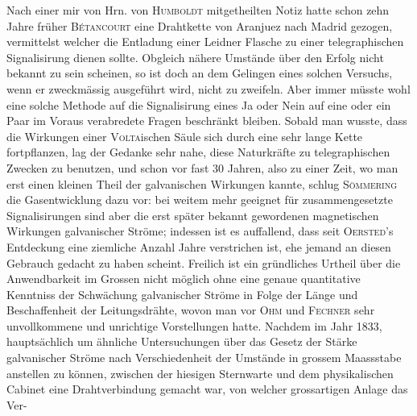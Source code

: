 \expandafter\def\csname HistoricalNoteText375\endcsname{Nach einer mir von Hrn. von \textsc{Humboldt} mitgetheilten Notiz hatte schon zehn Jahre früher \textsc{Bétancourt} eine Drahtkette von Aranjuez nach Madrid gezogen, vermittelst welcher die Entladung einer Leidner Flasche zu einer telegraphischen Signalisirung dienen sollte. Obgleich nähere Umstände über den Erfolg nicht bekannt zu sein scheinen, so ist doch an dem Gelingen eines solchen Versuchs, wenn er zweckmässig ausgeführt wird, nicht zu zweifeln. Aber immer müsste wohl eine solche Methode auf die Signalisirung eines Ja oder Nein auf eine oder ein Paar im Voraus verabredete Fragen beschränkt bleiben.}
Sobald man wusste, dass die Wirkungen einer \textsc{Volta}ischen Säule sich durch eine sehr lange Kette fortpflanzen, lag der Gedanke sehr nahe, diese Naturkräfte zu telegraphischen Zwecken zu benutzen, und schon vor fast 30 Jahren, also zu einer Zeit, wo man erst einen kleinen Theil der galvanischen Wirkungen kannte, schlug \textsc{Sömmering} die Gasentwicklung dazu vor: bei weitem mehr geeignet für zusammengesetzte Signalisirungen sind aber die erst später bekannt gewordenen magnetischen Wirkungen galvanischer Ströme; indessen ist es auffallend, dass seit \textsc{Oersted}'s Entdeckung eine ziemliche Anzahl Jahre verstrichen ist, ehe jemand an diesen Gebrauch gedacht zu haben scheint. Freilich ist ein gründliches Urtheil über die Anwendbarkeit im Grossen nicht möglich ohne eine genaue quantitative Kenntniss der Schwächung galvanischer Ströme in Folge der Länge und Beschaffenheit der Leitungsdrähte, wovon man vor \textsc{Ohm} und \textsc{Fechner} sehr unvollkommene und unrichtige Vorstellungen hatte. Nachdem im Jahr 1833, hauptsächlich um ähnliche Untersuchungen über das Gesetz der Stärke galvanischer Ströme nach Verschiedenheit der Umstände in grossem Maassstabe anstellen zu können, zwischen der hiesigen Sternwarte und dem physikalischen Cabinet eine Drahtverbindung gemacht war, von welcher grossartigen Anlage das Ver-
\par\clearpage
{}

